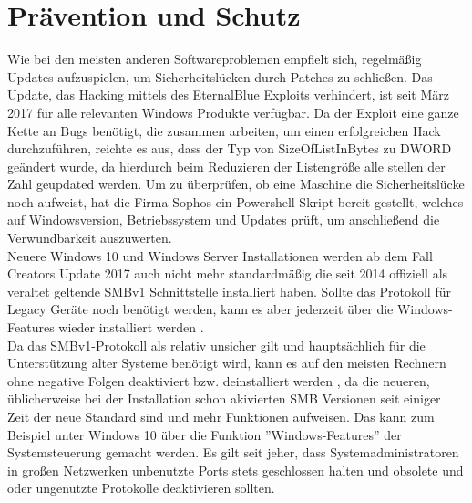 \documentclass[DIV=12,headings=normal,pdftex,headinclude=false,footinclude=false,final]{scrreprt}
\begin{document}
\chapter{Prävention und Schutz}
Wie bei den meisten anderen Softwareproblemen empfielt sich, regelmäßig Updates aufzuspielen, um Sicherheitslücken durch Patches zu schließen. Das Update, das Hacking mittels des EternalBlue Exploits verhindert, ist seit März 2017 für alle relevanten Windows Produkte verfügbar.
Da der Exploit eine ganze Kette an Bugs benötigt, die zusammen arbeiten, um einen erfolgreichen Hack durchzuführen, reichte es aus, dass der Typ von SizeOfListInBytes zu DWORD geändert wurde\cite{Scad:EB}, da hierdurch beim Reduzieren der Listengröße alle stellen der Zahl geupdated werden.
Um zu überprüfen, ob eine Maschine die Sicherheitslücke noch aufweist, hat die Firma Sophos ein Powershell-Skript bereit gestellt, welches auf Windowsversion, Betriebssystem und Updates prüft, um anschließend die Verwundbarkeit auszuwerten\cite{SAV}.\\
Neuere Windows 10 und Windows Server Installationen werden ab dem Fall Creators Update 2017 auch nicht mehr standardmäßig die seit 2014 offiziell als veraltet geltende SMBv1 Schnittstelle installiert haben. Sollte das Protokoll für Legacy Geräte noch benötigt werden, kann es aber jederzeit über die Windows-Features wieder installiert werden \cite{MS:Fix}.\\
Da das SMBv1-Protokoll als relativ unsicher gilt und hauptsächlich für die Unterstützung alter Systeme benötigt wird, kann es auf den meisten Rechnern ohne negative Folgen deaktiviert bzw. deinstalliert werden \cite{WP}, da die neueren, üblicherweise bei der Installation schon akivierten SMB Versionen  seit einiger Zeit der neue Standard sind und mehr Funktionen aufweisen. Das kann zum Beispiel unter Windows 10 über die Funktion ''Windows-Features'' der Systemsteuerung gemacht werden. Es gilt seit jeher, dass Systemadministratoren in großen Netzwerken unbenutzte Ports stets geschlossen halten und obsolete und oder ungenutzte Protokolle deaktivieren sollten.\cite{TM:EB}
\end{document}
